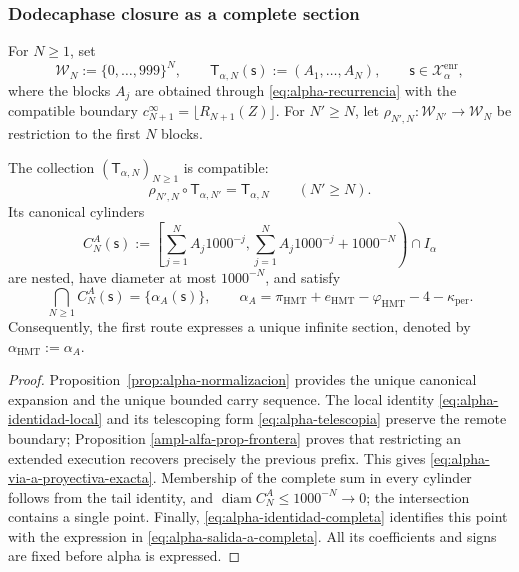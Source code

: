 \subsubsection{Dodecaphase closure as a complete section}

For \(N\geq1\), set
\[
 \mathcal W_N:=\{0,\ldots,999\}^{N},
 \qquad
 \mathsf T_{\alpha,N}(\mathsf s):=(A_1,\ldots,A_N),
 \qquad \mathsf s\in\mathcal X_{\alpha}^{\mathrm{enr}},
\]
where the blocks \(A_j\) are obtained through
\eqref{eq:alpha-recurrencia} with the compatible boundary
\(c_{N+1}^{\infty}=\lfloor R_{N+1}(Z)\rfloor\). For \(N'\geq N\), let
\(\rho_{N',N}:\mathcal W_{N'}\to\mathcal W_N\) be restriction to the
first \(N\) blocks.

\begin{theorem}
\label{thm:alpha-salida-dodecafasica-completa}
The collection \((\mathsf T_{\alpha,N})_{N\geq1}\) is compatible:
\begin{equation}
 \rho_{N',N}\circ\mathsf T_{\alpha,N'}
 =\mathsf T_{\alpha,N}
 \qquad(N'\geq N).
 \label{eq:alpha-via-a-proyectiva-exacta}
\end{equation}
Its canonical cylinders
\begin{equation}
 C_N^A(\mathsf s):=
 \left[
  \sum_{j=1}^{N}A_j1000^{-j},
  \sum_{j=1}^{N}A_j1000^{-j}+1000^{-N}
 \right)\cap I_\alpha
 \label{eq:alpha-cilindros-via-a-exactos}
\end{equation}
are nested, have diameter at most \(1000^{-N}\), and satisfy
\begin{equation}
 \bigcap_{N\geq1}C_N^A(\mathsf s)
 =\{\alpha_A(\mathsf s)\},
 \qquad
 \alpha_A
 =\pi_{\mathrm{HMT}}+e_{\mathrm{HMT}}-\varphi_{\mathrm{HMT}}
  -4-\kappa_{\mathrm{per}}.
 \label{eq:alpha-salida-a-completa}
\end{equation}
Consequently, the first route expresses a unique infinite section, denoted
by \(\alpha_{\mathrm{HMT}}:=\alpha_A\).
\end{theorem}

\begin{proof}
Proposition~\ref{prop:alpha-normalizacion} provides the unique
canonical expansion and the unique bounded carry sequence. The local identity
\eqref{eq:alpha-identidad-local} and its telescoping form
\eqref{eq:alpha-telescopia} preserve the remote boundary; Proposition
\ref{ampl-alfa-prop-frontera} proves that restricting an extended execution
recovers precisely the previous prefix. This gives
\eqref{eq:alpha-via-a-proyectiva-exacta}. Membership of the complete sum
in every cylinder follows from the tail identity, and
\(\operatorname{diam}C_N^A\leq1000^{-N}\to0\); the intersection contains
a single point. Finally, \eqref{eq:alpha-identidad-completa} identifies this
point with the expression in \eqref{eq:alpha-salida-a-completa}. All its
coefficients and signs are fixed before alpha is expressed.
\end{proof}

